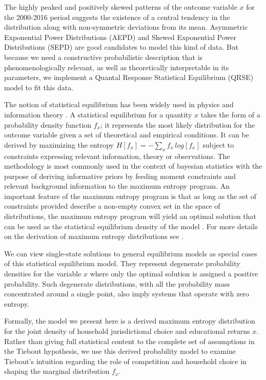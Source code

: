 The highly peaked and positively skewed patterns of the outcome
variable $x$ for the 2000-2016 period suggests the existence of a
central tendency in the distribution along with non-symmetric
deviations from its mean. Asymmetric Exponential Power Distributions
(AEPD) and Skewed Exponential Power Distributions (SEPD)
\citep{alfarano_statistical_2012,schafsim,mundt_asymmetric_2019}
are good candidates to model this kind of data. But because we need a
constructive probabilistic description that is phenomenologically
relevant, as well as theoretically interpretable in its parameters, we
implement a Quantal Response Statistical Equilibrium
(QRSE) model to fit this data.

The notion of statistical equilibrium has been widely used in physics
and information theory
\citep{jaynes_concentration_1983,jaynes_information_1957}. A
statistical equilibrium for a quantity $x$ takes the form of a
probability density function $f_{x}$; it represents the most likely
distribution for the outcome variable given a set of theoretical and
empirical conditions. It can be derived by maximizing the entropy
$H[f_{x}] = - \sum \limits_{x} f_{x} \, log[f_{x}]$ subject to
constraints expressing relevant information, theory or
observations. The methodology is most commonly used in the context of
bayesian statistics with the purpose of deriving informative priors by
feeding moment constraints and relevant background information to the
maximum entropy program. An important feature of the maximum entropy
program is that as long as the set of constraints provided describe a
non-empty convex set in the space of distributions, the maximum
entropy program will yield an optimal solution that can be used as the
statistical equilibrium density of the model
\citep{schafol,golan_foundations}. For more details on the
derivation of maximum entropy distributions see
\citep{sivia_data_2006,jaynes_probability_2003,golan_foundations}.

We can view single-state solutions to general equilibrium models as
special cases of this statistical equilibrium model. They represent
degenerate probability densities for the variable $x$ where only the
optimal solution is assigned a positive probability. Such degenerate
distributions, with all the probability mass concentrated around a
single point, also imply systems that operate with zero
entropy. 

Formally, the model we present here is a derived maximum
entropy distribution for the joint density of household jurisdictional
choice and educational returns $x$. Rather than giving full
statistical content to the complete set of assumptions in the Tiebout
hypothesis, we use this derived probability model to examine Tiebout's
intuition regarding the role of competition and household
choice in shaping the marginal distribution $f_{x}$.


